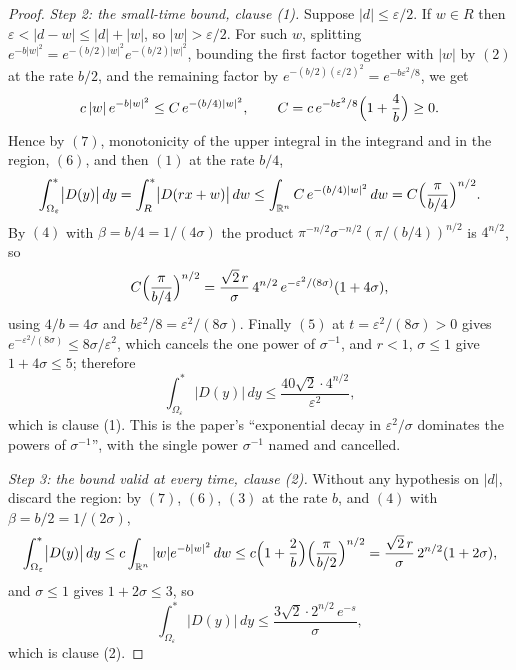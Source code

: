 \begin{proof}
\emph{Step 2: the small-time bound, clause (1).}
Suppose $|d| \leq \varepsilon/2$.  If $w \in R$ then
$\varepsilon < |d-w| \leq |d| + |w|$, so $|w| > \varepsilon/2$.  For such $w$,
splitting $e^{-b|w|^2} = e^{-(b/2)|w|^2}e^{-(b/2)|w|^2}$, bounding the first
factor together with $|w|$ by $(2)$ at the rate $b/2$, and the remaining factor
by $e^{-(b/2)(\varepsilon/2)^2} = e^{-b\varepsilon^2/8}$, we get
\[
  c\,|w|\,e^{-b|w|^2} \leq C\,e^{-(b/4)|w|^2} ,
  \qquad C = c\,e^{-b\varepsilon^2/8}\Bigl(1+\frac4b\Bigr) \geq 0 .
\]
Hence by $(7)$, monotonicity of the upper integral in the integrand and in the
region, $(6)$, and then $(1)$ at the rate $b/4$,
\[
  \int^*_{\Omega_\varepsilon}\bigl|D(y)\bigr|\,dy
    = \int^*_{R}\bigl|D(rx+w)\bigr|\,dw
    \leq \int_{\mathbb{R}^n} C\,e^{-(b/4)|w|^2}\,dw
    = C\Bigl(\frac{\pi}{b/4}\Bigr)^{n/2} .
\]
By $(4)$ with $\beta = b/4 = 1/(4\sigma)$ the product
$\pi^{-n/2}\sigma^{-n/2}(\pi/(b/4))^{n/2}$ is $4^{n/2}$, so
\[
  C\Bigl(\frac{\pi}{b/4}\Bigr)^{n/2}
    = \frac{\sqrt2\,r}{\sigma}\,4^{n/2}\,e^{-\varepsilon^2/(8\sigma)}(1+4\sigma) ,
\]
using $4/b = 4\sigma$ and $b\varepsilon^2/8 = \varepsilon^2/(8\sigma)$.  Finally
$(5)$ at $t = \varepsilon^2/(8\sigma) > 0$ gives
$e^{-\varepsilon^2/(8\sigma)} \leq 8\sigma/\varepsilon^2$, which cancels the one
power of $\sigma^{-1}$, and $r < 1$, $\sigma \leq 1$ give $1+4\sigma \leq 5$;
therefore
\[
  \int^*_{\Omega_\varepsilon}\bigl|D(y)\bigr|\,dy
    \leq \frac{40\sqrt2\cdot4^{n/2}}{\varepsilon^2} ,
\]
which is clause (1).  This is the paper's ``exponential decay in
$\varepsilon^2/\sigma$ dominates the powers of $\sigma^{-1}$'', with the single
power $\sigma^{-1}$ named and cancelled.

\emph{Step 3: the bound valid at every time, clause (2).}
Without any hypothesis on $|d|$, discard the region: by $(7)$, $(6)$, $(3)$ at
the rate $b$, and $(4)$ with $\beta = b/2 = 1/(2\sigma)$,
\[
  \int^*_{\Omega_\varepsilon}\bigl|D(y)\bigr|\,dy
    \leq c\int_{\mathbb{R}^n}|w|e^{-b|w|^2}\,dw
    \leq c\Bigl(1+\frac2b\Bigr)\Bigl(\frac{\pi}{b/2}\Bigr)^{n/2}
    = \frac{\sqrt2\,r}{\sigma}\,2^{n/2}(1+2\sigma) ,
\]
and $\sigma \leq 1$ gives $1+2\sigma \leq 3$, so
\[
  \int^*_{\Omega_\varepsilon}\bigl|D(y)\bigr|\,dy
    \leq \frac{3\sqrt2\cdot2^{n/2}\,e^{-s}}{\sigma} ,
\]
which is clause (2).
\end{proof}
